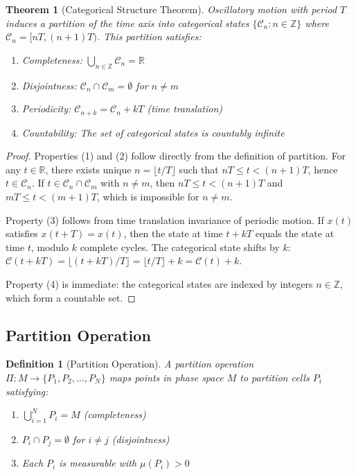 \documentclass[twocolumn,10pt]{article}
\newtheorem{theorem}{Theorem}[section]
\newtheorem{definition}{Definition}[section]
\begin{document}
\begin{theorem}[Categorical Structure Theorem]
\label{thm:categorical_structure}
Oscillatory motion with period $T$ induces a partition of the time axis into categorical states $\{\mathcal{C}_n : n \in \mathbb{Z}\}$ where $\mathcal{C}_n = [nT, (n+1)T)$. This partition satisfies:
\begin{enumerate}
\item Completeness: $\bigcup_{n \in \mathbb{Z}} \mathcal{C}_n = \mathbb{R}$
\item Disjointness: $\mathcal{C}_n \cap \mathcal{C}_m = \emptyset$ for $n \neq m$
\item Periodicity: $\mathcal{C}_{n+k} = \mathcal{C}_n + kT$ (time translation)
\item Countability: The set of categorical states is countably infinite
\end{enumerate}
\end{theorem}

\begin{proof}
Properties (1) and (2) follow directly from the definition of partition. For any $t \in \mathbb{R}$, there exists unique $n = \lfloor t/T \rfloor$ such that $nT \leq t < (n+1)T$, hence $t \in \mathcal{C}_n$. If $t \in \mathcal{C}_n \cap \mathcal{C}_m$ with $n \neq m$, then $nT \leq t < (n+1)T$ and $mT \leq t < (m+1)T$, which is impossible for $n \neq m$.

Property (3) follows from time translation invariance of periodic motion. If $x(t)$ satisfies $x(t+T) = x(t)$, then the state at time $t + kT$ equals the state at time $t$, modulo $k$ complete cycles. The categorical state shifts by $k$: $\mathcal{C}(t+kT) = \lfloor (t+kT)/T \rfloor = \lfloor t/T \rfloor + k = \mathcal{C}(t) + k$.

Property (4) is immediate: the categorical states are indexed by integers $n \in \mathbb{Z}$, which form a countable set.
\end{proof}

\subsection{Partition Operation}

\begin{definition}[Partition Operation]
A partition operation $\Pi: M \to \{P_1, P_2, \ldots, P_N\}$ maps points in phase space $M$ to partition cells $P_i$ satisfying:
\begin{enumerate}
\item $\bigcup_{i=1}^N P_i = M$ (completeness)
\item $P_i \cap P_j = \emptyset$ for $i \neq j$ (disjointness)
\item Each $P_i$ is measurable with $\mu(P_i) > 0$
\end{enumerate}
\end{definition}
\end{document}
